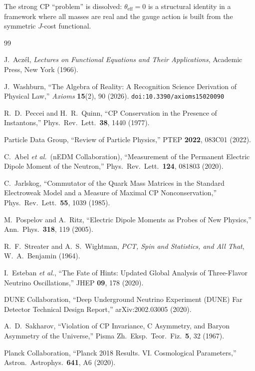 \documentclass[12pt,a4paper]{article}
\theoremstyle{definition}
\theoremstyle{remark}
\begin{document}
The strong CP ``problem'' is dissolved: $\theta_{\mathrm{eff}} = 0$
is a structural identity in a framework where all masses are real
and the gauge action is built from the symmetric $J$-cost functional.

\begin{thebibliography}{99}

J.~Acz\'el, \emph{Lectures on Functional Equations and Their Applications},
Academic Press, New York (1966).

J.~Washburn, ``The Algebra of Reality: A Recognition Science Derivation
of Physical Law,'' \emph{Axioms} \textbf{15}(2), 90 (2026).
\texttt{doi:10.3390/axioms15020090}

R.~D.~Peccei and H.~R.~Quinn, ``CP Conservation in the
Presence of Instantons,'' Phys.\ Rev.\ Lett.\ \textbf{38},
1440 (1977).

Particle Data Group, ``Review of Particle Physics,'' PTEP
\textbf{2022}, 083C01 (2022).

C.~Abel \textit{et al.}\ (nEDM Collaboration),
``Measurement of the Permanent Electric Dipole Moment of the
Neutron,'' Phys.\ Rev.\ Lett.\ \textbf{124}, 081803 (2020).

C.~Jarlskog, ``Commutator of the Quark Mass Matrices in the
Standard Electroweak Model and a Measure of Maximal CP
Nonconservation,'' Phys.\ Rev.\ Lett.\ \textbf{55}, 1039
(1985).

M.~Pospelov and A.~Ritz, ``Electric Dipole Moments as
Probes of New Physics,'' Ann.\ Phys.\ \textbf{318}, 119
(2005).

R.~F.~Streater and A.~S.~Wightman,
\textit{PCT, Spin and Statistics, and All That},
W.~A.~Benjamin (1964).

I.~Esteban \textit{et al.}, ``The Fate of Hints: Updated
Global Analysis of Three-Flavor Neutrino Oscillations,''
JHEP \textbf{09}, 178 (2020).

DUNE Collaboration, ``Deep Underground Neutrino Experiment
(DUNE) Far Detector Technical Design Report,''
arXiv:2002.03005 (2020).

A.~D.~Sakharov, ``Violation of CP Invariance, C Asymmetry,
and Baryon Asymmetry of the Universe,'' Pisma Zh.\ Eksp.\
Teor.\ Fiz.\ \textbf{5}, 32 (1967).

Planck Collaboration, ``Planck 2018 Results. VI. Cosmological
Parameters,'' Astron.\ Astrophys.\ \textbf{641}, A6 (2020).

\end{thebibliography}
\end{document}
